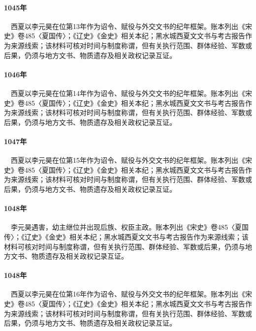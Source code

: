 \paragraph{1045年}　西夏以李元昊在位第13年作为诏令、赋役与外交文书的纪年框架。账本列出《宋史》卷485〈夏国传〉；《辽史》《金史》相关本纪；黑水城西夏文文书与考古报告作为来源线索；该材料可核对时间与制度称谓，但有关执行范围、群体经验、军数或后果，仍须与地方文书、物质遗存及相关政权记录互证。

\paragraph{1046年}　西夏以李元昊在位第14年作为诏令、赋役与外交文书的纪年框架。账本列出《宋史》卷485〈夏国传〉；《辽史》《金史》相关本纪；黑水城西夏文文书与考古报告作为来源线索；该材料可核对时间与制度称谓，但有关执行范围、群体经验、军数或后果，仍须与地方文书、物质遗存及相关政权记录互证。

\paragraph{1047年}　西夏以李元昊在位第15年作为诏令、赋役与外交文书的纪年框架。账本列出《宋史》卷485〈夏国传〉；《辽史》《金史》相关本纪；黑水城西夏文文书与考古报告作为来源线索；该材料可核对时间与制度称谓，但有关执行范围、群体经验、军数或后果，仍须与地方文书、物质遗存及相关政权记录互证。

\paragraph{1048年}　李元昊遇害，幼主继位并出现后族、权臣主政。账本列出《宋史》卷485〈夏国传〉；《辽史》《金史》相关本纪；黑水城西夏文文书与考古报告作为来源线索；该材料可核对时间与制度称谓，但有关执行范围、群体经验、军数或后果，仍须与地方文书、物质遗存及相关政权记录互证。

\paragraph{1048年}　西夏以李元昊在位第16年作为诏令、赋役与外交文书的纪年框架。账本列出《宋史》卷485〈夏国传〉；《辽史》《金史》相关本纪；黑水城西夏文文书与考古报告作为来源线索；该材料可核对时间与制度称谓，但有关执行范围、群体经验、军数或后果，仍须与地方文书、物质遗存及相关政权记录互证。

